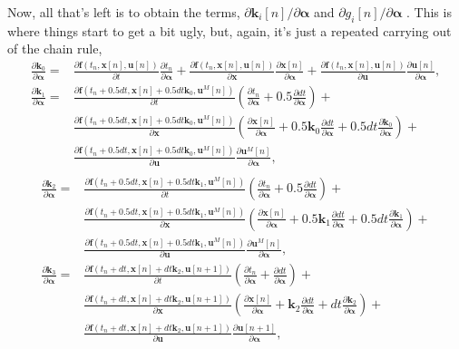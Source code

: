 \documentclass[onecolumn,12pt]{article}
\newcommand{\bs}{\boldsymbol}
\begin{document}
Now, all that's left is to obtain the terms, $  {\partial \bs k_i[n]}/{\partial \bs \alpha}$ and $  {\partial g_i[n]}/{\partial \bs \alpha}$ . This is where things start to get a bit ugly, but, again, it's just a repeated carrying out of the chain rule,
\begin{equation*}
\begin{split}
\frac{\partial \bs k_0}{\partial \bs \alpha} =& \frac{\partial \bs f(t_n,\bs x[n], \bs u[n])}{\partial t}\frac{\partial t_n}{\partial \bs \alpha} + \frac{\partial \bs f(t_n,\bs x[n], \bs u[n])}{\partial \bs x}\frac{\partial \bs x[n]}{\partial \bs \alpha}  + \frac{\partial \bs f(t_n,\bs x[n], \bs u[n])}{\partial \bs u}\frac{\partial \bs u [n]}{\partial \bs \alpha},
\\[2ex]
\frac{\partial \bs k_1}{\partial \bs \alpha} =& \frac{\partial \bs f(t_n+0.5dt,\bs x[n]+0.5dt \bs k_0,\bs u^M[n])}{\partial t} \left( \frac{\partial t_n}{\partial \bs \alpha} + 0.5\frac{\partial dt}{\partial \bs \alpha}  \right)+\\
& \frac{\partial \bs f(t_n+0.5dt,\bs x[n]+0.5dt \bs k_0,\bs u^M[n])}{\partial \bs x} \left( \frac{\partial \bs x[n]}{\partial \bs \alpha} + 0.5\bs k_0\frac{\partial dt}{\partial \bs \alpha} + 0.5dt\frac{\partial \bs k_0}{\partial \bs \alpha}  \right) +\\
&  \frac{\partial \bs f(t_n+0.5dt,\bs x[n]+0.5dt \bs k_0,\bs u^M[n])}{\partial \bs u}\frac{\partial \bs u^M[n]}{\partial \bs \alpha},
\\
\end{split}
\end{equation*}
\begin{equation*}
\begin{split}
\frac{\partial \bs k_2}{\partial \bs \alpha} =& \frac{\partial \bs f(t_n+0.5dt,\bs x[n]+0.5dt \bs k_1,\bs u^M[n])}{\partial t} \left( \frac{\partial t_n}{\partial \bs \alpha} + 0.5\frac{\partial dt}{\partial \bs \alpha}  \right)+\\
& \frac{\partial \bs f(t_n+0.5dt,\bs x[n]+0.5dt \bs k_1,\bs u^M[n])}{\partial \bs x} \left( \frac{\partial \bs x[n]}{\partial \bs \alpha} + 0.5\bs k_1\frac{\partial dt}{\partial \bs \alpha} + 0.5dt\frac{\partial \bs k_1}{\partial \bs \alpha}  \right) +\\
&  \frac{\partial \bs f(t_n+0.5dt,\bs x[n]+0.5dt \bs k_1,\bs u^M[n])}{\partial \bs u}\frac{\partial \bs u^M[n]}{\partial \bs \alpha},
\\[2ex]
\frac{\partial \bs k_3}{\partial \bs \alpha} =& \frac{\partial \bs f(t_n+dt,\bs x[n]+dt \bs k_2,\bs u[n+1])}{\partial t} \left( \frac{\partial t_n}{\partial \bs \alpha} + \frac{\partial dt}{\partial \bs \alpha}  \right)+\\
& \frac{\partial \bs f(t_n+dt,\bs x[n]+dt \bs k_2,\bs u[n+1])}{\partial \bs x} \left( \frac{\partial \bs x[n]}{\partial \bs \alpha} + \bs k_2\frac{\partial dt}{\partial \bs \alpha} + dt\frac{\partial \bs k_2}{\partial \bs \alpha}  \right) +\\
&  \frac{\partial \bs f(t_n+dt,\bs x[n]+dt \bs k_2,\bs u[n+1])}{\partial \bs u}\frac{\partial \bs u[n+1]}{\partial \bs \alpha},
\\[1ex]
\end{split}
\end{equation*}
\end{document}
